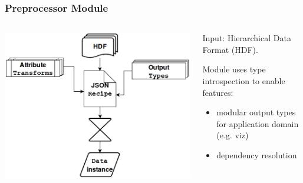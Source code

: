 \documentclass{beamer}
\begin{document}
\renewcommand{\theimage}{\includegraphics[width=1.2\linewidth]{img/reader_flowchart4.png}}%
\begin{frame}\frametitle{Preprocessor Module}
    \begin{columns}
        \begin{column}{.5\textwidth}
            \centerline{\theimage}            
        \end{column}

        \begin{column}{.5\textwidth}
            Input: Hierarchical Data Format (HDF).

            Module uses type introspection to enable features:
            \begin{itemize}
            \item modular output types for application domain (e.g. viz)                
            \item dependency resolution                
            \end{itemize}
        \end{column}
    \end{columns}
\end{frame}
\end{document}

